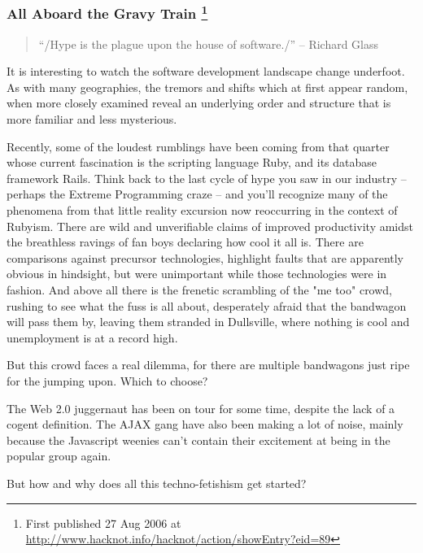 \documentclass{article}
\begin{document}
\subsubsection{All Aboard the Gravy Train \footnote{First published 27 Aug 2006 at
\url{http://www.hacknot.info/hacknot/action/showEntry?eid=89}}}
\label{sec:orgheadline421}

\begin{quote}
“/Hype is the plague upon the house of software./” -- Richard Glass
\end{quote}

It is interesting to watch the software development landscape change
underfoot. As with many geographies, the tremors and shifts which at
first appear random, when more closely examined reveal an underlying
order and structure that is more familiar and less mysterious.

Recently, some of the loudest rumblings have been coming from that
quarter whose current fascination is the scripting language Ruby, and
its database framework Rails. Think back to the last cycle of hype you
saw in our industry -- perhaps the Extreme Programming craze -- and
you'll recognize many of the phenomena from that little reality
excursion now reoccurring in the context of Rubyism. There are wild and
unverifiable claims of improved productivity amidst the breathless
ravings of fan boys declaring how cool it all is. There are comparisons
against precursor technologies, highlight faults that are apparently
obvious in hindsight, but were unimportant while those technologies were
in fashion. And above all there is the frenetic scrambling of the "me
too" crowd, rushing to see what the fuss is all about, desperately
afraid that the bandwagon will pass them by, leaving them stranded in
Dullsville, where nothing is cool and unemployment is at a record high.

But this crowd faces a real dilemma, for there are multiple bandwagons
just ripe for the jumping upon. Which to choose?

The Web 2.0 juggernaut has been on tour for some time, despite the lack
of a cogent definition. The AJAX gang have also been making a lot of
noise, mainly because the Javascript weenies can't contain their
excitement at being in the popular group again.

But how and why does all this techno-fetishism get started?
\end{document}
